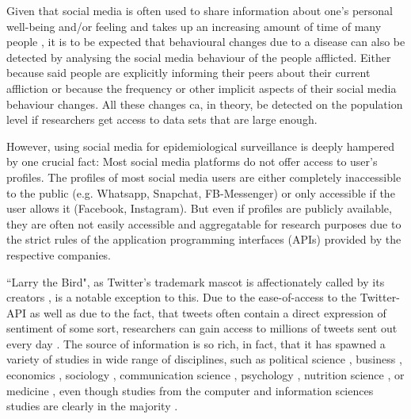\documentclass[11pt, a4paper,twoside]{report}\usepackage[]{graphicx}\usepackage[]{color}
\begin{document}
Given that social media is often used to share information about one's personal well-being and/or feeling and takes up an increasing amount of time of many people \citep{bauer_timeonline_2016,scott_time_2017,asano_socialmediatime_2017}, it is to be expected that behavioural changes due to a disease can also be detected by analysing the social media behaviour of the people afflicted. Either because said people are explicitly informing their peers about their current affliction or because the frequency or other implicit aspects of their social media behaviour changes. All these changes ca, in theory, be detected on the population level if researchers get access to data sets that are large enough.

However, using social media for epidemiological surveillance is deeply hampered by one crucial fact: Most social media platforms do not offer access to user's profiles. The profiles of most social media users are either completely inaccessible to the public (e.g. Whatsapp, Snapchat, FB-Messenger) or only accessible if the user allows it (Facebook, Instagram). But even if profiles are publicly available, they are often not easily accessible and aggregatable for research purposes due to the strict rules of the application programming interfaces (APIs) provided by the respective companies.

``Larry the Bird", as Twitter's trademark mascot is affectionately called by its creators \citep{rehak_twitterbird_2014}, is a notable exception to this. Due to the ease-of-access to the Twitter-API as well as due to the fact, that tweets often contain a direct expression of sentiment of some sort, researchers can gain access to millions of tweets sent out every day \citep{twitter_annual_2017}. The source of information is so rich, in fact, that it has spawned a variety of studies in wide range of disciplines, such as political science \citep{tumasjan2010predicting,tumasjan2011election,stieglitz2012political,newman2016tracking}, business \citep{swani2014should,chae2015insights}, economics \citep{bollen2011twitter,bollen2011modeling,zhang2012predicting,sul2014trading}, sociology \citep{poblete2011all,himelboim2013birds,mccormick2015using}, communication science \citep{zhao2009and,marwick2011tweet,himelboim2013birds,hermida2013journalism}, psychology \citep{chen2011tweet,golbeck2011predicting,qiu2012you,eichstaedt2015psychological,braithwaite2016validating}, nutrition science \citep{widener2014using,vidal2015using, abbar2015you}, or medicine \citep{salathe2013dynamics,love2013twitter,nwosu2014social,adrover2015identifying,eichstaedt2015psychological,mowery2017feature}, even though studies from the computer and information sciences studies are clearly in the majority \citep{lee2013real,zimmer2014topology,steiger2015advanced}. 
\end{document}
